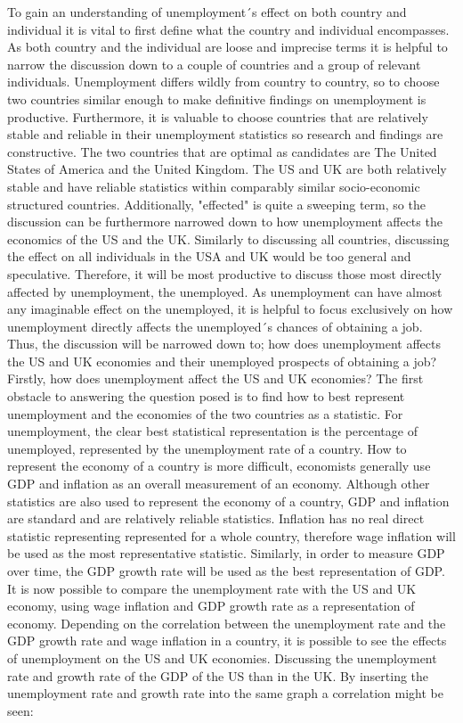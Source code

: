 To gain an understanding of unemployment´s effect on both country and individual it is vital to first define what the country and individual encompasses.
As both country and the individual are loose and imprecise terms it is helpful to narrow the discussion down to a couple of countries and a group of relevant individuals.
Unemployment differs wildly from country to country, so to choose two countries similar enough to make definitive findings on unemployment is productive.
Furthermore, it is valuable to choose countries that are relatively stable and reliable in their unemployment statistics so research and findings are constructive.
The two countries that are optimal as candidates are The United States of America and the United Kingdom.
The US and UK are both relatively stable and have reliable statistics within comparably similar socio-economic structured countries. \cite{Economic_similarities_US_UK}
Additionally, "effected" is quite a sweeping term, so the discussion can be furthermore narrowed down to how unemployment affects the economics of the US and the UK.
Similarly to discussing all countries, discussing the effect on all individuals in the USA and UK would be too general and speculative.
Therefore, it will be most productive to discuss those most directly affected by unemployment, the unemployed.
As unemployment can have almost any imaginable effect on the unemployed, it is helpful to focus exclusively on how unemployment directly affects the unemployed´s chances of obtaining a job.
Thus, the discussion will be narrowed down to; how does unemployment affects the US and UK economies and their unemployed prospects of obtaining a job? \\

Firstly, how does unemployment affect the US and UK economies?
The first obstacle to answering the question posed is to find how to best represent unemployment and the economies of the two countries as a statistic.
For unemployment, the clear best statistical representation is the percentage of unemployed, represented by the unemployment rate of a country.
How to represent the economy of a country is more difficult, economists generally use GDP and inflation as an overall measurement of an economy.
Although other statistics are also used to represent the economy of a country, GDP and inflation are standard and are relatively reliable statistics. \cite{GDP_Inflation_Economics} 
Inflation has no real direct statistic representing represented for a whole country, therefore wage inflation will be used as the most representative statistic.
Similarly, in order to measure GDP over time, the GDP growth rate will be used as the best representation of GDP.
It is now possible to compare the unemployment rate with the US and UK economy, using wage inflation and GDP growth rate as a representation of economy.
Depending on the correlation between the unemployment rate and the GDP growth rate and wage inflation in a country, it is possible to see the effects of unemployment on the US and UK economies.
Discussing the unemployment rate and growth rate of the GDP of the US than in the UK.
By inserting the unemployment rate and growth rate into the same graph a correlation might be seen: \\

